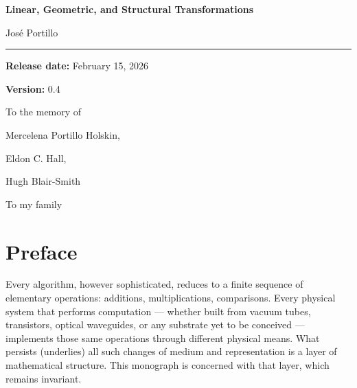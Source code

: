 \documentclass[12pt,openany]{book}
\theoremstyle{definition}
\begin{document}
\pagestyle{plain}

\frontmatter

\begin{titlepage}
\thispagestyle{empty}

\vspace*{2.2cm}

{\Large\bfseries
Linear, Geometric, and Structural Transformations\par}
\vspace{0.4cm}

\vspace{1.4cm}
{\Large Jos\'e Portillo\par}

\vspace{1.8cm}
\rule{\textwidth}{0.6pt}
\vspace{0.35cm}

{\small
\textbf{Release date:} February 15, 2026\par
\textbf{Version:} 0.4\par
}

\vfill

\end{titlepage}


\thispagestyle{empty}
\null\vfill
\begin{center}
To the memory of\par
Mercelena Portillo Holskin,\par
Eldon C. Hall,\par
Hugh Blair-Smith\par
\vspace{1cm}
To my family
\end{center}
\vfill\null
\clearpage

\tableofcontents

\chapter*{Preface}

Every algorithm, however sophisticated, reduces to a finite sequence of
elementary operations: additions, multiplications, comparisons.
Every physical system that performs computation --- whether built from vacuum
tubes, transistors, optical waveguides, or any substrate yet to be conceived
--- implements those same operations through different physical means.
What persists (underlies) all such changes of medium and representation is
a layer of mathematical structure.
This monograph is concerned with that layer, which remains invariant.
\end{document}
